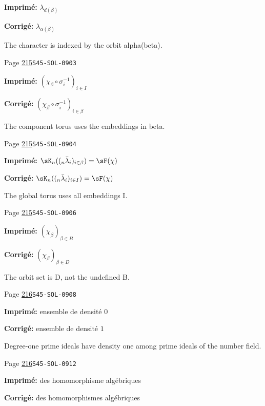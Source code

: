 \begin{description}
\par\noindent\textbf{Imprimé:} \(\lambda_{d(\beta)}\)
\par\noindent\textbf{Corrigé:} \(\lambda_{\alpha(\beta)}\)
\par\noindent The character is indexed by the orbit alpha(beta).
\smallskip
\item[\hypertarget{apparatus:FR-0223}{223}] Page \hyperlink{printpage:fr:215}{215}\quad\texttt{S45-SOL-0903}
\par\noindent\textbf{Imprimé:} \((\chi_\beta\circ \sigma_i^{-1})_{i\in I}\)
\par\noindent\textbf{Corrigé:} \((\chi_\beta\circ \sigma_i^{-1})_{i\in\beta}\)
\par\noindent The component torus uses the embeddings in beta.
\smallskip
\item[\hypertarget{apparatus:FR-0224}{224}] Page \hyperlink{printpage:fr:215}{215}\quad\texttt{S45-SOL-0904}
\par\noindent\textbf{Imprimé:} \(\sK_n((_n\bar\lambda_i)_{i\in \beta}) = \sF(\chi)\)
\par\noindent\textbf{Corrigé:} \(\sK_n((_n\bar\lambda_i)_{i\in I}) = \sF(\chi)\)
\par\noindent The global torus uses all embeddings I.
\smallskip
\item[\hypertarget{apparatus:FR-0225}{225}] Page \hyperlink{printpage:fr:215}{215}\quad\texttt{S45-SOL-0906}
\par\noindent\textbf{Imprimé:} \((\chi_\beta)_{\beta\in B}\)
\par\noindent\textbf{Corrigé:} \((\chi_\beta)_{\beta\in D}\)
\par\noindent The orbit set is D, not the undefined B.
\smallskip
\item[\hypertarget{apparatus:FR-0226}{226}] Page \hyperlink{printpage:fr:216}{216}\quad\texttt{S45-SOL-0908}
\par\noindent\textbf{Imprimé:} ensemble de densité $0$
\par\noindent\textbf{Corrigé:} ensemble de densité $1$
\par\noindent Degree-one prime ideals have density one among prime ideals of the number field.
\smallskip
\item[\hypertarget{apparatus:FR-0227}{227}] Page \hyperlink{printpage:fr:216}{216}\quad\texttt{S45-SOL-0912}
\par\noindent\textbf{Imprimé:} des homomorphisme algébriques
\par\noindent\textbf{Corrigé:} des homomorphismes algébriques

\end{description}
